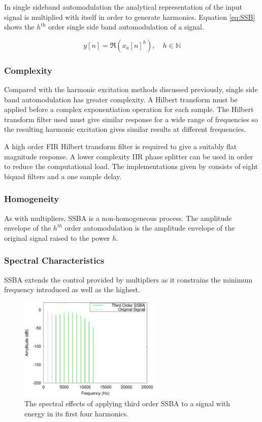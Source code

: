 		In single sideband automodulation the analytical representation of the input signal is multiplied with
		itself in order to generate harmonics. Equation \ref{eq:SSB} shows the $h^{\text{th}}$ order single side
		band automodulation of a signal.

		\begin{equation}
			y[n] = \Re \left( x_{a}[n]^{h} \right), \quad h \in \mathbb{N}
			\label{eq:SSB}
		\end{equation}

		\subsubsection*{Complexity}
			Compared with the harmonic excitation methods discussed previously, single side band automodulation
			has greater complexity. A Hilbert transform must be applied before a complex exponentiation
			operation for each sample. The Hilbert transform filter used must give similar response for a wide
			range of frequencies so the resulting harmonic excitation gives similar results at different
			frequencies.
			
			A high order FIR Hilbert transform filter is required to give a suitably flat magnitude response.
			A lower complexity IIR phase splitter can be used in order to reduce the computational load.
			The implementations given by \citet{niemitalo2003hilbert} consists of eight biquad filters and a
			one sample delay.
			
		\subsubsection*{Homogeneity}
			As with multipliers, SSBA is a non-homogeneous process. The amplitude envelope of the $h^{th}$
			order automodulation is the amplitude envelope of the original signal raised to the power $h$. 

		\subsubsection*{Spectral Characteristics}
			SSBA extends the control provided by multipliers as it constrains the minimum frequency introduced
			as well as the highest.

			\begin{figure}[h!]
				\centering
				\includegraphics[width=0.6\textwidth]{chapter3/Images/SSBA3Spectra.eps}
				\caption{The spectral effects of applying third order SSBA to a signal with energy in its 
				         first four harmonics.}
				\label{fig:SSBA3Spectra}
			\end{figure}


